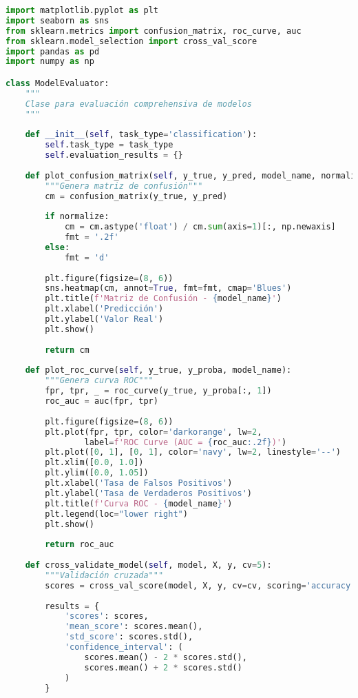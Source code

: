 \begin{lstlisting}[language=Python, caption=Módulo de evaluación de modelos]
import matplotlib.pyplot as plt
import seaborn as sns
from sklearn.metrics import confusion_matrix, roc_curve, auc
from sklearn.model_selection import cross_val_score
import pandas as pd
import numpy as np

class ModelEvaluator:
    """
    Clase para evaluación comprehensiva de modelos
    """
    
    def __init__(self, task_type='classification'):
        self.task_type = task_type
        self.evaluation_results = {}
    
    def plot_confusion_matrix(self, y_true, y_pred, model_name, normalize=False):
        """Genera matriz de confusión"""
        cm = confusion_matrix(y_true, y_pred)
        
        if normalize:
            cm = cm.astype('float') / cm.sum(axis=1)[:, np.newaxis]
            fmt = '.2f'
        else:
            fmt = 'd'
        
        plt.figure(figsize=(8, 6))
        sns.heatmap(cm, annot=True, fmt=fmt, cmap='Blues')
        plt.title(f'Matriz de Confusión - {model_name}')
        plt.xlabel('Predicción')
        plt.ylabel('Valor Real')
        plt.show()
        
        return cm
    
    def plot_roc_curve(self, y_true, y_proba, model_name):
        """Genera curva ROC"""
        fpr, tpr, _ = roc_curve(y_true, y_proba[:, 1])
        roc_auc = auc(fpr, tpr)
        
        plt.figure(figsize=(8, 6))
        plt.plot(fpr, tpr, color='darkorange', lw=2, 
                label=f'ROC Curve (AUC = {roc_auc:.2f})')
        plt.plot([0, 1], [0, 1], color='navy', lw=2, linestyle='--')
        plt.xlim([0.0, 1.0])
        plt.ylim([0.0, 1.05])
        plt.xlabel('Tasa de Falsos Positivos')
        plt.ylabel('Tasa de Verdaderos Positivos')
        plt.title(f'Curva ROC - {model_name}')
        plt.legend(loc="lower right")
        plt.show()
        
        return roc_auc
    
    def cross_validate_model(self, model, X, y, cv=5):
        """Validación cruzada"""
        scores = cross_val_score(model, X, y, cv=cv, scoring='accuracy')
        
        results = {
            'scores': scores,
            'mean_score': scores.mean(),
            'std_score': scores.std(),
            'confidence_interval': (
                scores.mean() - 2 * scores.std(),
                scores.mean() + 2 * scores.std()
            )
        }
        

\end{lstlisting}
